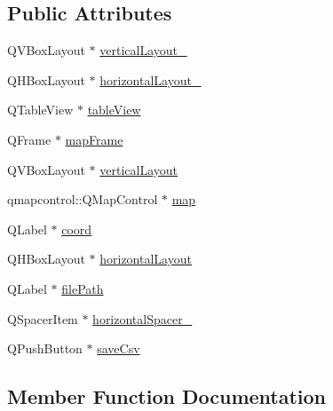 \subsection*{Public Attributes}
\begin{DoxyCompactItemize}
\item 
Q\+V\+Box\+Layout $\ast$ \mbox{\hyperlink{class_ui___csv_specs_page_aa903c10890417377a15bef538f6fc8bc}{vertical\+Layout\+\_}}
\item 
Q\+H\+Box\+Layout $\ast$ \mbox{\hyperlink{class_ui___csv_specs_page_a88d10f170c96e2e052dc0cc01feb11e5}{horizontal\+Layout\+\_}}
\item 
Q\+Table\+View $\ast$ \mbox{\hyperlink{class_ui___csv_specs_page_a3685b132e6c387d3593b9abda97d3419}{table\+View}}
\item 
Q\+Frame $\ast$ \mbox{\hyperlink{class_ui___csv_specs_page_a225a1724c524f182cd670b02f4f65921}{map\+Frame}}
\item 
Q\+V\+Box\+Layout $\ast$ \mbox{\hyperlink{class_ui___csv_specs_page_acc92eb757dd766698893a6be60200f63}{vertical\+Layout}}
\item 
qmapcontrol\+::\+Q\+Map\+Control $\ast$ \mbox{\hyperlink{class_ui___csv_specs_page_a004d394d05b7f2339a3cd585516b0fa6}{map}}
\item 
Q\+Label $\ast$ \mbox{\hyperlink{class_ui___csv_specs_page_af1a8188323748f5130e2390608fd58ce}{coord}}
\item 
Q\+H\+Box\+Layout $\ast$ \mbox{\hyperlink{class_ui___csv_specs_page_adf8fbbe16ac3495e738b7832b04ca6f2}{horizontal\+Layout}}
\item 
Q\+Label $\ast$ \mbox{\hyperlink{class_ui___csv_specs_page_acf92e9ec5e76214026aeea5fc9874ea3}{file\+Path}}
\item 
Q\+Spacer\+Item $\ast$ \mbox{\hyperlink{class_ui___csv_specs_page_ae530f6068b251533003089d0ec173d97}{horizontal\+Spacer\+\_}}
\item 
Q\+Push\+Button $\ast$ \mbox{\hyperlink{class_ui___csv_specs_page_ab6287a7a611cf2b323adecf75f2c6dbb}{save\+Csv}}
\end{DoxyCompactItemize}


\subsection{Member Function Documentation}
\mbox{\label{class_ui___csv_specs_page_afcc295c32a143233c82512fb29f1b1bc}} 
